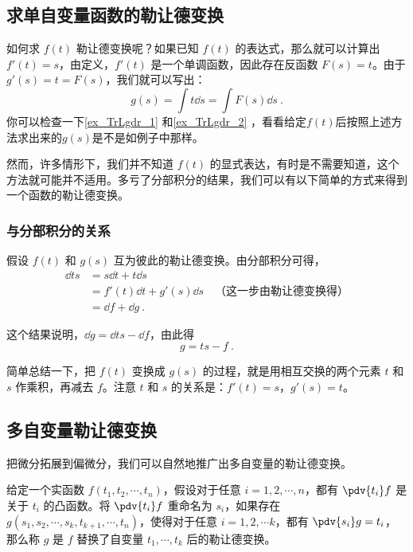 \subsection{求单自变量函数的勒让德变换}



如何求 $f(t)$ 勒让德变换呢？如果已知 $f(t)$ 的表达式，那么就可以计算出 $f'(t)=s$，由定义，$f'(t)$ 是一个单调函数，因此存在反函数 $F(s)=t$。由于 $g'(s)=t=F(s)$，我们就可以写出：
\begin{equation}
g(s)=\int t \dd{s}=\int F(s) \dd{s}~.
\end{equation}
你可以检查一下\autoref{ex_TrLgdr_1} 和\autoref{ex_TrLgdr_2} ，看看给定$f(t)$后按照上述方法求出来的$g(s)$是不是如例子中那样。

然而，许多情形下，我们并不知道 $f(t)$ 的显式表达，有时是不需要知道，这个方法就可能并不适用。多亏了分部积分的结果，我们可以有以下简单的方式来得到一个函数的勒让德变换。


\subsubsection{与分部积分的关系}

假设 $f(t)$ 和 $g(s)$ 互为彼此的勒让德变换。由分部积分可得，
\begin{equation}
\begin{aligned}
\dd{ts}&=s\dd{t}+t\dd{s}\\&=f'(t)\dd{t}+g'(s)\dd{s}\quad\text{（这一步由勒让德变换得）}\\&=\dd{f}+\dd{g}~.
\end{aligned}
\end{equation}

这个结果说明，$\dd{g}=\dd{ts}-\dd{f}$，由此得
\begin{equation}
g=ts-f~.
\end{equation}

简单总结一下，把 $f(t)$ 变换成 $g(s)$ 的过程，就是用相互交换的两个元素 $t$ 和 $s$ 作乘积，再减去 $f$。注意 $t$ 和 $s$ 的关系是：$f'(t)=s$，$g'(s)=t$。

\subsection{多自变量勒让德变换}

把微分拓展到偏微分，我们可以自然地推广出多自变量的勒让德变换。

\begin{definition}{}\label{def_TrLgdr_1}
给定一个实函数 $f(t_1, t_2, \cdots, t_n)$，假设对于任意 $i=1, 2, \cdots, n$，都有 $\pdv{t_i}f$ 是关于 $t_i$ 的凸函数。将 $\pdv{t_i}f$ 重命名为 $s_i$，如果存在 $g(s_1, s_2, \cdots, s_k, t_{k+1},\cdots, t_n)$，使得对于任意 $i=1,2,\cdots k$，都有 $\pdv{s_i}g=t_i$，那么称 $g$ 是 $f$ 替换了自变量 $t_1, \cdots, t_k$ 后的勒让德变换。
\end{definition}

